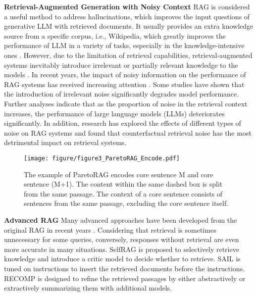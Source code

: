 \textbf{Retrieval-Augmented Generation with Noisy Context} RAG \cite{guuREALMRetrievalaugmentedLanguage2020, lewisRetrievalaugmentedGenerationKnowledgeintensive2020} is considered a useful method to address hallucinations, which improves the input questions of generative LLM with retrieved documents. It usually provides an extra knowledge source from a specific corpus, i.e., Wikipedia, which greatly improves the performance of LLM in a variety of tasks, especially in the knowledge-intensive ones \cite{ramInContextRetrievalAugmentedLanguage2023}. However, due to the limitation of retrieval capabilities, retrieval-augmented systems inevitably introduce irrelevant or partially relevant knowledge to the models \cite{yinALCUNALargeLanguage2023}. In recent years, the impact of noisy information on the performance of RAG systems has received increasing attention \cite{zhuFreeLBEnhancedAdversarial2019, yuChainofNoteEnhancingRobustness2024}.  Some studies \cite{jiaAdversarialExamplesEvaluating2017, creswellSelectionInferenceExploitingLarge2022} have shown that the introduction of irrelevant noise significantly degrades model performance. Further analyses \cite{chenBenchmarkingLargeLanguage2025} indicate that as the proportion of noise in the retrieval context increases, the performance of large language models (LLMs) deteriorates significantly. In addition, research \cite{fangEnhancingNoiseRobustness2024a} has explored the effects of different types of noise on RAG systems and found that counterfactual retrieval noise has the most detrimental impact on retrieval systems.

\begin{figure}[ht!]
    \centering
    \texttt{[image: figure/figure3\_ParetoRAG\_Encode.pdf]}
    \caption{The example of ParetoRAG encodes core sentence M and core sentence (M+1). The content within the same dashed box is split from the same passage. The context of a core sentence consists of sentences from the same passage, excluding the core sentence itself.}
    \label{fig:Pareto Encode Example}
\end{figure} 

\textbf{Advanced RAG} Many advanced approaches have been developed from the original RAG in recent years \cite{kimSuReSummarizingRetrievals2023, zhang2024raft, liuRAISFLearningAnswer2024, patilGorillaLargeLanguage2024}. Considering that retrieval is sometimes unnecessary for some queries, conversely, responses without retrieval are even more accurate in many situations. SelfRAG \cite{asaiSelfRAGLearningRetrieve2023a} is proposed to selectively retrieve knowledge and introduce a critic model to decide whether to retrieve. SAIL \cite{luoSearchAugmentedInstruction2023} is tuned on instructions to insert the retrieved documents before the instructions. RECOMP \cite{xu2024recomp} is designed to refine the retrieved passages by either abstractively or extractively summarizing them with additional models.


